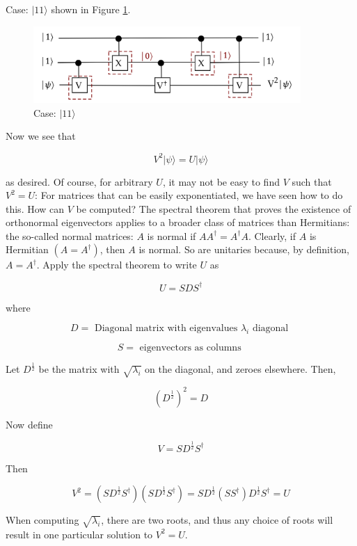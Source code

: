 \documentclass[main.tex]{subfiles}
\begin{document}
    Case: $|11\rangle$ shown in Figure \ref{fig:15ccu5}.
    
    \begin{figure}
        \centering
        \includegraphics[width=4in]{notes/figs/n09/15ccu5.png}
        \caption{Case: $|11\rangle$}
        \label{fig:15ccu5}
    \end{figure}
    
    Now we see that
    
    $$
    V^{2}|\psi\rangle=U|\psi\rangle
    $$
    
    as desired. Of course, for arbitrary $U$, it may not be easy to find $V$ such that $V^{2}=U$: For matrices that can be easily exponentiated, we have seen how to do this. How can $V$ be computed? The spectral theorem that proves the existence of orthonormal eigenvectors applies to a broader class of matrices than Hermitians: the so-called normal matrices: $A$ is normal if $A A^{\dagger}=A^{\dagger} A$. Clearly, if $A$ is Hermitian $\left(A=A^{\dagger}\right)$, then $A$ is normal. So are unitaries because, by definition, $A=A^{\dagger}$. Apply the spectral theorem to write $U$ as
    
    $$
    U=S D S^{\dagger}
    $$
    
    where
    
    $$
    D=\text { Diagonal matrix with eigenvalues } \lambda_{i} \text { diagonal }
    $$
    
    $$
    S=\text { eigenvectors as columns }
    $$
    
    Let $D^{\frac{1}{2}}$ be the matrix with $\sqrt{\lambda_{i}}$ on the diagonal, and zeroes elsewhere. Then,
    
    $$
    \left(D^{\frac{1}{2}}\right)^{2}=D
    $$
    
    Now define
    
    $$
    V=S D^{\frac{1}{2}} S^{\dagger}
    $$
    
    Then
    
    $$
    V^{2}=\left(S D^{\frac{1}{2}} S^{\dagger}\right)\left(S D^{\frac{1}{2}} S^{\dagger}\right)=S D^{\frac{1}{2}}\left(S S^{\dagger}\right) D^{\frac{1}{2}} S^{\dagger}=U
    $$
    
    When computing $\sqrt{\lambda_{i}}$, there are two roots, and thus any choice of roots will result in one particular solution to $V^{2}=U$.
\end{document}
